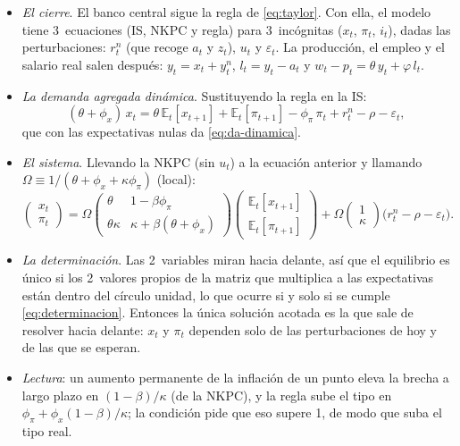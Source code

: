\documentclass[11pt]{article}
\begin{document}
\begin{itemize}
\item \emph{El cierre}. El banco central sigue la regla de  \eqref{eq:taylor}. Con ella, el modelo tiene 3~ecuaciones (IS, NKPC y regla) para 3~incógnitas ($x_t$, $\pi_t$, $i_t$), dadas las perturbaciones: $r^n_t$ (que recoge $a_t$ y $z_t$), $u_t$ y $\varepsilon_t$. La producción, el empleo y el salario real salen después: $y_t=x_t+y^n_t$, $l_t=y_t-a_t$ y $w_t-p_t=\theta\,y_t+\varphi\,l_t$.
\item \emph{La demanda agregada dinámica}. Sustituyendo la regla en la IS:
  $$(\theta+\phi_x)\,x_t=\theta\,\mathbb{E}_t[x_{t+1}]+\mathbb{E}_t[\pi_{t+1}]-\phi_\pi\,\pi_t+r^n_t-\rho-\varepsilon_t,$$
  que con las expectativas nulas da \eqref{eq:da-dinamica}.
\item \emph{El sistema}. Llevando la NKPC (sin $u_t$) a la ecuación anterior y llamando $\Omega\equiv1/(\theta+\phi_x+\kappa\phi_\pi)$ (local):
  $$\begin{pmatrix}x_t\\ \pi_t\end{pmatrix}=\Omega\begin{pmatrix}\theta & 1-\beta\phi_\pi\\ \theta\kappa & \kappa+\beta(\theta+\phi_x)\end{pmatrix}\begin{pmatrix}\mathbb{E}_t[x_{t+1}]\\ \mathbb{E}_t[\pi_{t+1}]\end{pmatrix}+\Omega\begin{pmatrix}1\\ \kappa\end{pmatrix}\big(r^n_t-\rho-\varepsilon_t\big).$$
\item \emph{La determinación}. Las 2~variables miran hacia delante, así que el equilibrio es único si los 2~valores propios de la matriz que multiplica a las expectativas están dentro del círculo unidad, lo que ocurre si y solo si se cumple \eqref{eq:determinacion}\nocite{Gali2015Monetary}. Entonces la única solución acotada es la que sale de resolver hacia delante: $x_t$ y $\pi_t$ dependen solo de las perturbaciones de hoy y de las que se esperan.
\item \emph{Lectura}: un aumento permanente de la inflación de un punto eleva la brecha a largo plazo en $(1-\beta)/\kappa$ (de la NKPC), y la regla sube el tipo en $\phi_\pi+\phi_x(1-\beta)/\kappa$; la condición pide que eso supere 1, de modo que suba el tipo real. \findemo
\end{itemize}
\end{document}

